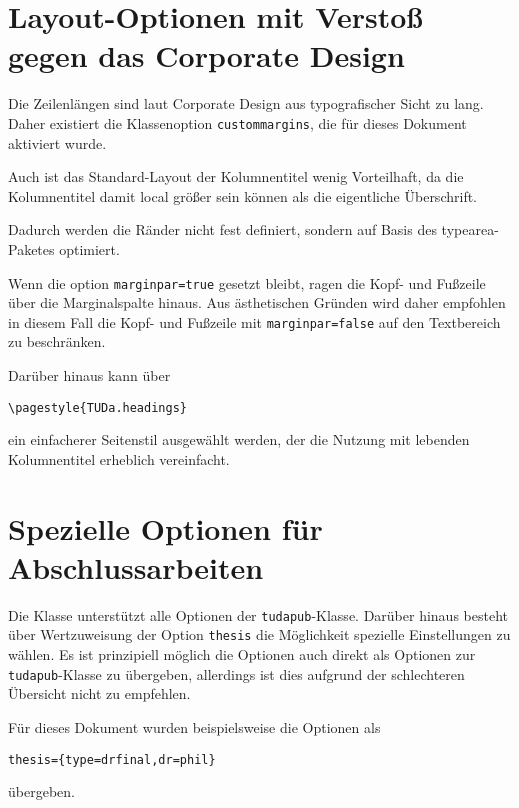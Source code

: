 \documentclass[
	ngerman,
	ruledheaders=chapter,%
	class=book,%
	thesis={
		type=dr,
		dr=rernat
	},
	accentcolor=9c,%
	custommargins=true,%
	marginpar=false,%
	parskip=half-,%
	fontsize=11pt,%
]{tudapub}
\let\file\texttt
\let\code\texttt
\begin{document}
\section{Layout-Optionen mit Verstoß gegen das Corporate Design}
Die Zeilenlängen sind laut Corporate Design aus typografischer Sicht zu lang.
Daher existiert die Klassenoption \code{custommargins}, die für dieses Dokument aktiviert wurde.

Auch ist das Standard-Layout der Kolumnentitel wenig Vorteilhaft, da die Kolumnentitel damit local größer sein können als die eigentliche Überschrift.

	
Dadurch werden die Ränder nicht fest definiert, sondern auf Basis des typearea-Paketes optimiert. 

Wenn die option \code{marginpar=true} gesetzt bleibt, ragen die Kopf- und Fußzeile über die Marginalspalte hinaus. Aus ästhetischen Gründen wird daher empfohlen in diesem Fall die Kopf- und Fußzeile  mit \code{marginpar=false}  auf den Textbereich zu beschränken.
	
	
Darüber hinaus kann über 
\begin{verbatim}
\pagestyle{TUDa.headings}
\end{verbatim}
ein einfacherer Seitenstil ausgewählt werden, der die Nutzung mit lebenden Kolumnentitel erheblich vereinfacht.


\section{Spezielle Optionen für Abschlussarbeiten}
Die Klasse unterstützt alle Optionen der \file{tudapub}-Klasse. Darüber hinaus besteht über Wertzuweisung der Option \code{thesis} die Möglichkeit spezielle Einstellungen zu wählen.
Es ist prinzipiell möglich die Optionen auch direkt als Optionen zur \file{tudapub}-Klasse zu übergeben, allerdings ist dies aufgrund der schlechteren Übersicht nicht zu empfehlen.

Für dieses Dokument wurden beispielsweise die Optionen als 
\begin{verbatim}
thesis={type=drfinal,dr=phil}
\end{verbatim}
übergeben.
\end{document}

